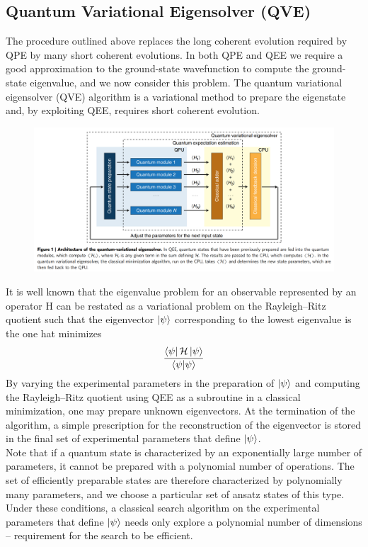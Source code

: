 \documentclass{book}
\theoremstyle{definition}
\newcommand{\had}{\mathcal{H}}
\newcommand{\f}[2]{\frac{#1}{#2}}
\begin{document}
\newpage


\subsection{Quantum Variational Eigensolver (QVE)}

The procedure outlined above
replaces the long coherent evolution required by QPE by many
short coherent evolutions. In both QPE and QEE we require a
good approximation to the ground-state wavefunction to compute the ground-state eigenvalue, and we now consider this
problem. The quantum variational eigensolver (QVE) algorithm
is a variational method to prepare the eigenstate and, by
exploiting QEE, requires short coherent evolution. 

\begin{figure}[!htb]
	\centering
	\includegraphics[scale=0.2]{qvei}
\end{figure}

It is well known that the eigenvalue problem for an observable
represented by an operator H can be restated as a variational
problem on the Rayleigh–Ritz quotient such that the eigenvector $\ket{\psi}$ corresponding to the lowest eigenvalue is the one hat minimizes
\begin{align}
\f{\bra{\psi} \had \ket{\psi}}{\braket{\psi}}
\end{align}
By varying the experimental parameters in the preparation of $\ket{\psi}$ and computing the Rayleigh–Ritz quotient using QEE as
a subroutine in a classical minimization, one may prepare
unknown eigenvectors. At the termination of the algorithm, a
simple prescription for the reconstruction of the eigenvector is
stored in the final set of experimental parameters that define $\ket{\psi}$. \\

Note that if a quantum state is characterized by an exponentially large
number of parameters, it cannot be prepared with a polynomial
number of operations. The set of efficiently preparable states are
therefore characterized by polynomially many parameters, and
we choose a particular set of ansatz states of this type.  Under
these conditions, a classical search algorithm on the experimental
parameters that define $\ket{\psi}$ needs only explore a polynomial
number of dimensions -- requirement for the search to be
efficient.\\
\end{document}
